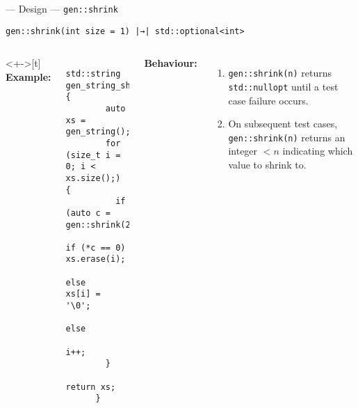 \begin{frame}[fragile]{\halcheck{} --- Design --- \texttt{gen::shrink}}
  \begin{center}
    \texttt{gen::shrink(int size = 1) |→| std::optional<int>}
  \end{center}


  \begin{columns}<+->[t]
    \textbf{Example:}

    \begin{verbatim}
      std::string gen_string_shrink() {
        auto xs = gen_string();
        for (size_t i = 0; i < xs.size();) {
          if (auto c = gen::shrink(2))
            if (*c == 0) xs.erase(i);
            else         xs[i] = '\0';
          else
            i++;
        }
        return xs;
      }
    \end{verbatim}

    \textbf{Behaviour:}
    \begin{enumerate}
      \item<+-> \texttt{gen::shrink(n)} returns \texttt{std::nullopt} until a test case failure occurs.
      \item<+> On subsequent test cases, \texttt{gen::shrink(n)} returns an integer $< n$ indicating which value to shrink to.
    \end{enumerate}
  \end{columns}
\end{frame}

